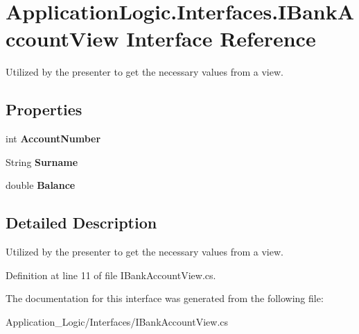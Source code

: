 \hypertarget{interface_application_logic_1_1_interfaces_1_1_i_bank_account_view}{
\section{ApplicationLogic.Interfaces.IBankAccountView Interface Reference}
\label{interface_application_logic_1_1_interfaces_1_1_i_bank_account_view}
}


Utilized by the presenter to get the necessary values from a view.  


\subsection*{Properties}
\begin{DoxyCompactItemize}
\item 
\hypertarget{interface_application_logic_1_1_interfaces_1_1_i_bank_account_view_a7523042b875cdee6466d9f33277cf46c}{
int {\bfseries AccountNumber}}
\label{interface_application_logic_1_1_interfaces_1_1_i_bank_account_view_a7523042b875cdee6466d9f33277cf46c}

\item 
\hypertarget{interface_application_logic_1_1_interfaces_1_1_i_bank_account_view_ac43f5050ebe6b6f9af491d350a62cba8}{
String {\bfseries Surname}}
\label{interface_application_logic_1_1_interfaces_1_1_i_bank_account_view_ac43f5050ebe6b6f9af491d350a62cba8}

\item 
\hypertarget{interface_application_logic_1_1_interfaces_1_1_i_bank_account_view_adf5d169c57f890bfd143a7f229b6b13c}{
double {\bfseries Balance}}
\label{interface_application_logic_1_1_interfaces_1_1_i_bank_account_view_adf5d169c57f890bfd143a7f229b6b13c}

\end{DoxyCompactItemize}


\subsection{Detailed Description}
Utilized by the presenter to get the necessary values from a view. 

Definition at line 11 of file IBankAccountView.cs.



The documentation for this interface was generated from the following file:\begin{DoxyCompactItemize}
\item 
Application\_\-Logic/Interfaces/IBankAccountView.cs\end{DoxyCompactItemize}

